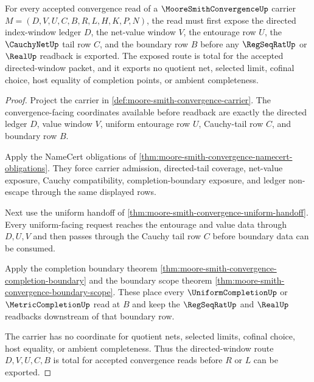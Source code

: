 \begin{theorem}
\label{thm:mooresmith-convergence-directed-window-totality}
For every accepted convergence read of a $\MooreSmithConvergenceUp$ carrier $M=(D,V,U,C,B,R,L,H,K,P,N)$, the read must first expose the directed index-window ledger $D$, the net-value window $V$, the entourage row $U$, the $\CauchyNetUp$ tail row $C$, and the boundary row $B$ before any $\RegSeqRatUp$ or $\RealUp$ readback is exported. The exposed route is total for the accepted directed-window packet, and it exports no quotient net, selected limit, cofinal choice, host equality of completion points, or ambient completeness.
\end{theorem}
\begin{proof}
Project the carrier in \autoref{def:moore-smith-convergence-carrier}. The convergence-facing coordinates available before readback are exactly the directed ledger $D$, value window $V$, uniform entourage row $U$, Cauchy-tail row $C$, and boundary row $B$.

Apply the NameCert obligations of \autoref{thm:moore-smith-convergence-namecert-obligations}. They force carrier admission, directed-tail coverage, net-value exposure, Cauchy compatibility, completion-boundary exposure, and ledger non-escape through the same displayed rows.

Next use the uniform handoff of \autoref{thm:moore-smith-convergence-uniform-handoff}. Every uniform-facing request reaches the entourage and value data through $D,U,V$ and then passes through the Cauchy tail row $C$ before boundary data can be consumed.

Apply the completion boundary theorem \autoref{thm:moore-smith-convergence-completion-boundary} and the boundary scope theorem \autoref{thm:moore-smith-convergence-boundary-scope}. These place every $\UniformCompletionUp$ or $\MetricCompletionUp$ read at $B$ and keep the $\RegSeqRatUp$ and $\RealUp$ readbacks downstream of that boundary row.

The carrier has no coordinate for quotient nets, selected limits, cofinal choice, host equality, or ambient completeness. Thus the directed-window route $D,V,U,C,B$ is total for accepted convergence reads before $R$ or $L$ can be exported.
\end{proof}

